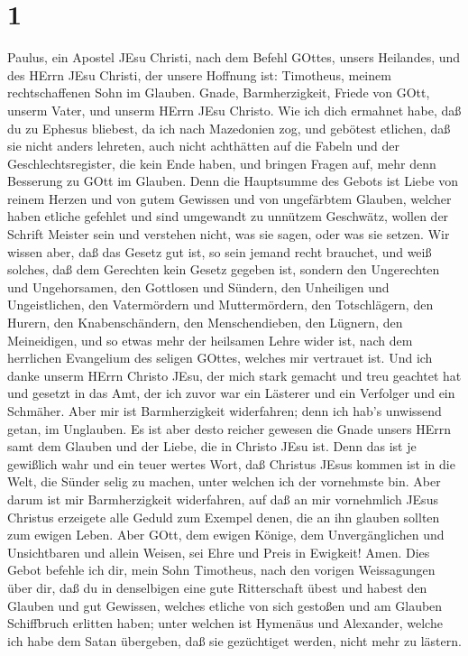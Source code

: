 \hypertarget{section}{%
\section{1}\label{section}}

 Paulus, ein Apostel JEsu Christi, nach dem Befehl GOttes,
unsers Heilandes, und des HErrn JEsu Christi, der unsere Hoffnung ist:
 Timotheus, meinem rechtschaffenen Sohn im Glauben. Gnade,
Barmherzigkeit, Friede von GOtt, unserm Vater, und unserm HErrn JEsu
Christo.  Wie ich dich ermahnet habe, daß du zu Ephesus
bliebest, da ich nach Mazedonien zog, und gebötest etlichen, daß sie
nicht anders lehreten,  auch nicht achthätten auf die Fabeln
und der Geschlechtsregister, die kein Ende haben, und bringen Fragen
auf, mehr denn Besserung zu GOtt im Glauben.  Denn die
Hauptsumme des Gebots ist Liebe von reinem Herzen und von gutem Gewissen
und von ungefärbtem Glauben,  welcher haben etliche gefehlet
und sind umgewandt zu unnützem Geschwätz,  wollen der
Schrift Meister sein und verstehen nicht, was sie sagen, oder was sie
setzen.  Wir wissen aber, daß das Gesetz gut ist, so sein
jemand recht brauchet,  und weiß solches, daß dem Gerechten
kein Gesetz gegeben ist, sondern den Ungerechten und Ungehorsamen, den
Gottlosen und Sündern, den Unheiligen und Ungeistlichen, den
Vatermördern und Muttermördern, den Totschlägern,  den
Hurern, den Knabenschändern, den Menschendieben, den Lügnern, den
Meineidigen, und so etwas mehr der heilsamen Lehre wider ist,
 nach dem herrlichen Evangelium des seligen GOttes, welches
mir vertrauet ist.  Und ich danke unserm HErrn Christo
JEsu, der mich stark gemacht und treu geachtet hat und gesetzt in das
Amt,  der ich zuvor war ein Lästerer und ein Verfolger und
ein Schmäher. Aber mir ist Barmherzigkeit widerfahren; denn ich hab's
unwissend getan, im Unglauben.  Es ist aber desto reicher
gewesen die Gnade unsers HErrn samt dem Glauben und der Liebe, die in
Christo JEsu ist.  Denn das ist je gewißlich wahr und ein
teuer wertes Wort, daß Christus JEsus kommen ist in die Welt, die Sünder
selig zu machen, unter welchen ich der vornehmste bin. 
Aber darum ist mir Barmherzigkeit widerfahren, auf daß an mir
vornehmlich JEsus Christus erzeigete alle Geduld zum Exempel denen, die
an ihn glauben sollten zum ewigen Leben.  Aber GOtt, dem
ewigen Könige, dem Unvergänglichen und Unsichtbaren und allein Weisen,
sei Ehre und Preis in Ewigkeit! Amen.  Dies Gebot befehle
ich dir, mein Sohn Timotheus, nach den vorigen Weissagungen über dir,
daß du in denselbigen eine gute Ritterschaft übest  und
habest den Glauben und gut Gewissen, welches etliche von sich gestoßen
und am Glauben Schiffbruch erlitten haben;  unter welchen
ist Hymenäus und Alexander, welche ich habe dem Satan übergeben, daß sie
gezüchtiget werden, nicht mehr zu lästern.

